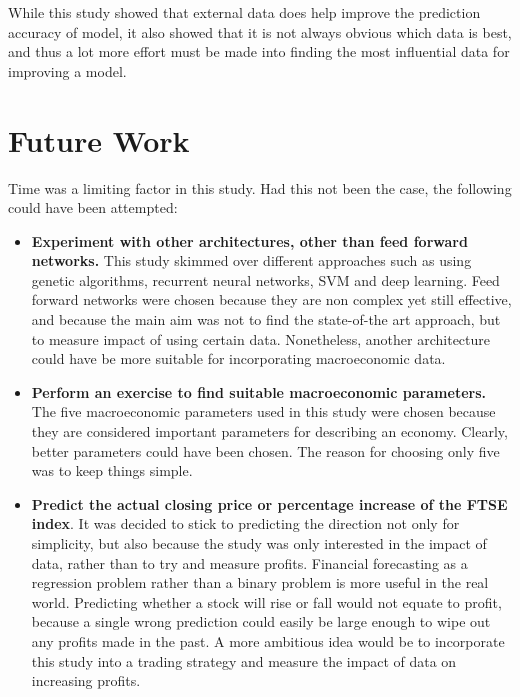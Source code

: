 \documentclass{UoYCSproject}
\begin{document}
While this study showed that external data does help improve the prediction accuracy of model, it also showed that it is not always obvious which data is best, and thus a lot more effort must be made into finding the most influential data for improving a model.

\section{Future Work}
Time was a limiting factor in this study. Had this not been the case, the following could have been attempted:
\begin{itemize}
    \item \textbf{Experiment with other architectures, other than feed forward networks.} This study skimmed over different approaches such as using genetic algorithms, recurrent neural networks, SVM and deep learning. Feed forward networks were chosen because they are non complex yet still effective, and because the main aim was not to find the state-of-the art approach, but to measure impact of using certain data. Nonetheless, another architecture could have be more suitable for incorporating macroeconomic data. 
    \item \textbf{Perform an exercise to find suitable macroeconomic parameters.} The five macroeconomic parameters used in this study were chosen because they are considered important parameters for describing an economy. Clearly, better parameters could have been chosen. The reason for choosing only five was to keep things simple. 
    \item \textbf{Predict the actual closing price or percentage increase of the FTSE index}. It was decided to stick to predicting the direction not only for simplicity, but also because the study was only interested in the impact of data, rather than to try and measure profits. Financial forecasting as a regression problem rather than a binary problem is more useful in the real world. Predicting whether a stock will rise or fall would not equate to profit, because a single wrong prediction could easily be large enough to wipe out any profits made in the past. A more ambitious idea would be to incorporate this study into a trading strategy and measure the impact of data on increasing profits. 
\end{itemize}

\printbibliography
\end{document}
